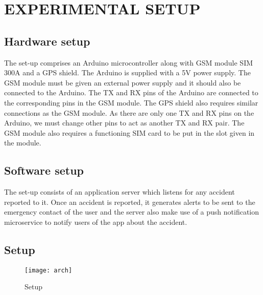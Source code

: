 \chapter{EXPERIMENTAL SETUP}

\section{Hardware setup}

The set-up comprises an Arduino microcontroller along with GSM module SIM 300A and a GPS shield. The Arduino is supplied with a 5V power supply. The GSM module must be given an external power supply and it should also be connected to the Arduino. The TX and RX pins of the Arduino are connected to the corresponding pins in the GSM module. The GPS shield also requires similar connections as the GSM module. As there are only one TX and RX pins on the Arduino, we must change other pins to act as another TX and RX pair. The GSM module also requires a functioning SIM card to be put in the slot given in the module. 

\section{Software setup}

The set-up consists of an application server which listens for any accident reported to it. Once an accident is reported, it generates alerts to be sent to the emergency contact of the user and the server also make use of a push notification microservice to notify users of the app about the accident.


\pagebreak
\section{Setup}

\begin{figure}[h!]
	\centering
	\texttt{[image: arch]}
	\caption{Setup}
	\label{fig:arch}
\end{figure}
